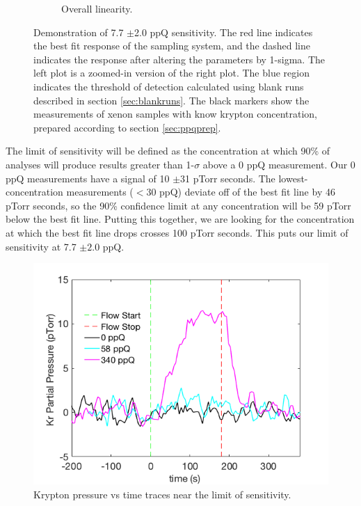 \begin{figure}[h!]
\begin{subfigure}{0.5\textwidth}
  \caption{Overall linearity.}
\end{subfigure}
\caption{Demonstration of 7.7 $\pm$2.0 ppQ sensitivity. The red line indicates the best fit response of the sampling system, and the dashed line indicates the response after altering the parameters by 1-sigma. The left plot is a zoomed-in version of the right plot. The blue region indicates the threshold of detection calculated using blank runs described in section \ref{sec:blankruns}. The black markers show the measurements of xenon samples with know krypton concentration, prepared according to section \ref{sec:ppqprep}.}
\label{fig:linplot2017}
\end{figure}

The limit of sensitivity will be defined as the concentration at which 90\% of analyses will produce results greater than 1-$\sigma$ above a 0 ppQ measurement. Our 0 ppQ measurements have a signal of 10 $\pm$31 pTorr seconds. The lowest-concentration measurements ($<30$ ppQ) deviate off of the best fit line by 46 pTorr seconds, so the 90\% confidence limit at any concentration will be 59 pTorr below the best fit line. Putting this together, we are looking for the concentration at which the best fit line drops crosses 100 pTorr seconds. This puts our limit of sensitivity at 7.7 $\pm 2.0$ ppQ.


\begin{figure}[h!]
  \includegraphics[width=\linewidth]{Figures/SLAC_PvT_ppq_sensitivity.png}
  \caption{Krypton pressure vs time traces near the limit of sensitivity.}
  \label{fig:senstrace}
\end{figure}



























